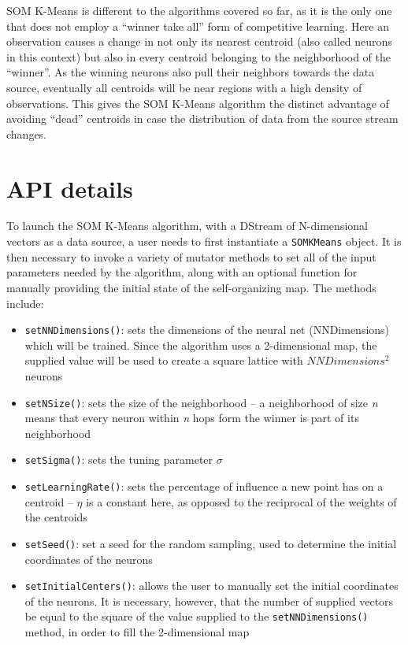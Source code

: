 \documentclass{l4proj}
\begin{document}
SOM K-Means is different to the algorithms covered so far, as it is the only one that does not employ a ``winner take all'' form of competitive learning. Here an observation causes a change in not only its nearest centroid (also called neurons in this context) but also in every centroid belonging to the neighborhood of the ``winner''. As the winning neurons also pull their neighbors towards the data source, eventually all centroids will be near regions with a high density of observations. This gives the SOM K-Means algorithm the distinct advantage of avoiding ``dead'' centroids in case the distribution of data from the source stream changes.

\section{API details}

To launch the SOM K-Means algorithm, with a DStream of N-dimensional vectors as a data source, a user needs to first instantiate a \texttt{SOMKMeans} object. It is then necessary to invoke a variety of mutator methods to set all of the input parameters needed by the algorithm, along with an optional function for manually providing the initial state of the self-organizing map. The methods include:

\begin{itemize}
\item \texttt{setNNDimensions()}: sets the dimensions of the neural net (NNDimensions) which will be trained. Since the algorithm uses a 2-dimensional map, the supplied value will be used to create a square lattice with $NNDimensions^2$ neurons
\item \texttt{setNSize()}: sets the size of the neighborhood -- a neighborhood of size \textit{n} means that every neuron within \textit{n} hops form the winner is part of its neighborhood
\item \texttt{setSigma()}: sets the tuning parameter $\sigma$
\item \texttt{setLearningRate()}: sets the percentage of influence a new point has on a centroid -- $\eta$ is a constant here, as opposed to the reciprocal of the weights of the centroids
\item \texttt{setSeed()}: set a seed for the random sampling, used to determine the initial coordinates of the neurons
\item \texttt{setInitialCenters()}: allows the user to manually set the initial coordinates of the neurons. It is necessary, however, that the number of supplied vectors be equal to the square of the value supplied to the \texttt{setNNDimensions()} method, in order to fill the 2-dimensional map
\end{itemize}
\end{document}
